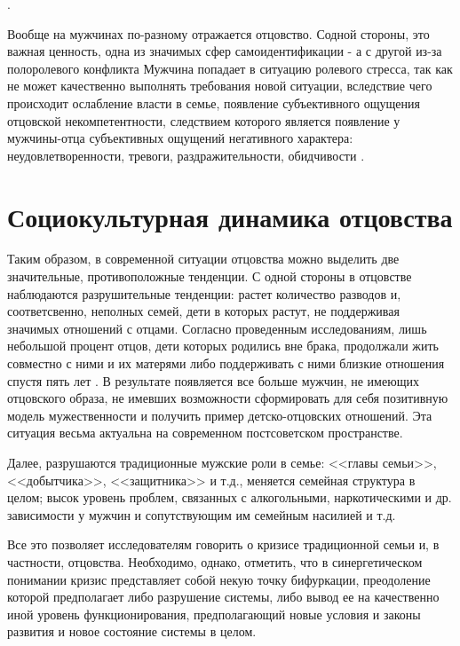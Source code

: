 \documentclass{../../common/thesisbyxetex}
\begin{document}
.

Вообще на мужчинах по-разному отражается отцовство. Содной стороны, это важная ценность, одна из
значимых сфер самоидентификации - а с другой из-за полоролевого конфликта  Мужчина попадает в
ситуацию ролевого стресса, так как не может
качественно выполнять требования новой ситуации, вследствие чего происходит
ослабление власти в семье, появление субъективного ощущения отцовской
некомпетентности, следствием которого является появление у мужчины-отца
субъективных ощущений негативного характера: неудовлетворенности, тревоги,
раздражительности, обидчивости \cite[111]{confl}.






\section{Социокультурная динамика отцовства}


Таким образом, в современной ситуации отцовства можно выделить две значительные, противоположные
тенденции. С одной стороны  в отцовстве наблюдаются разрушительные тенденции: растет количество
разводов и, соответсвенно, неполных семей, дети в которых растут, не поддерживая значимых отношений
с отцами. Согласно проведенным исследованиям, лишь небольшой процент отцов, дети которых
родились вне брака, продолжали жить совместно с ними и их матерями либо поддерживать с ними близкие
отношения спустя пять лет \cite{long}. В результате появляется все больше мужчин, не имеющих
отцовского образа, не имевших возможности сформировать для себя позитивную модель мужественности и
получить пример детско-отцовских отношений. Эта ситуация весьма актуальна на современном
постсоветском пространстве.

Далее, разрушаются традиционные мужские роли в семье: <<главы семьи>>,
<<добытчика>>, <<защитника>> и т.д., меняется семейная структура в целом; высок уровень проблем,
связанных с алкогольными, наркотическими и др. зависимости у мужчин и сопутствующим им семейным
насилией и т.д.

Все это позволяет исследователям говорить о кризисе традиционной семьи и, в частности, отцовства.
Необходимо, однако, отметить, что в синергетическом понимании кризис представляет собой некую точку
бифуркации, преодоление которой предполагает либо разрушение системы, либо вывод ее на качественно
иной уровень функционирования, предполагающий новые условия и законы развития и новое состояние
системы в целом.
\end{document}
